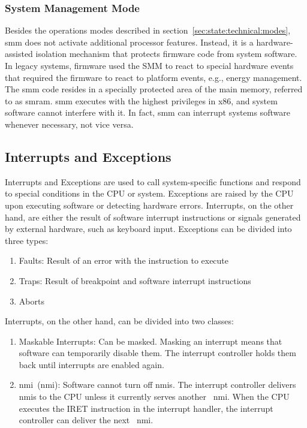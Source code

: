 \subsubsection{System Management Mode}
\label{sec:state:technical:smm}
Besides the operations modes described in
section~\ref{sec:state:technical:modes}, \gls{smm} does not activate additional
processor features. Instead, it is a hardware-assisted isolation
mechanism that protects firmware code from system software. In legacy systems,
firmware used the SMM to react to special hardware events that required the
firmware to react to platform events, e.g., energy management. The \gls{smm} code
resides in a specially protected area of the main memory, referred to as
\gls{smram}. \gls{smm} executes with the highest privileges in x86, and system
software cannot interfere with it. In fact, \gls{smm} can interrupt
systems software whenever necessary, not vice versa.

\subsection{Interrupts and Exceptions}
\label{sec:state:technical:interrupts}
Interrupts and Exceptions are used to call system-specific functions and respond
to special conditions in the CPU or system. Exceptions are raised by the CPU
upon executing software or detecting hardware errors. Interrupts, on the other
hand, are either the result of software interrupt instructions or signals
generated by external hardware, such as keyboard input. Exceptions can be
divided into three types:
\begin{enumerate}
    \item Faults: Result of an error with the instruction to execute
    \item Traps: Result of breakpoint and software interrupt instructions
    \item Aborts
\end{enumerate}
Interrupts, on the other hand, can be divided into two classes:
\begin{enumerate}
    \item Maskable Interrupts: Can be masked. Masking an interrupt means that
          software can temporarily disable them. The interrupt controller holds
          them back until interrupts are enabled again.
    \item \Gls{nmi}~(\gls{nmi}): Software cannot turn off
          \glspl{nmi}. The interrupt controller delivers~
          \glspl{nmi} to the CPU unless it currently serves another~
          \gls{nmi}. When the CPU executes the IRET instruction in the
          interrupt handler, the interrupt controller can deliver the next~
          \gls{nmi}.
\end{enumerate}

